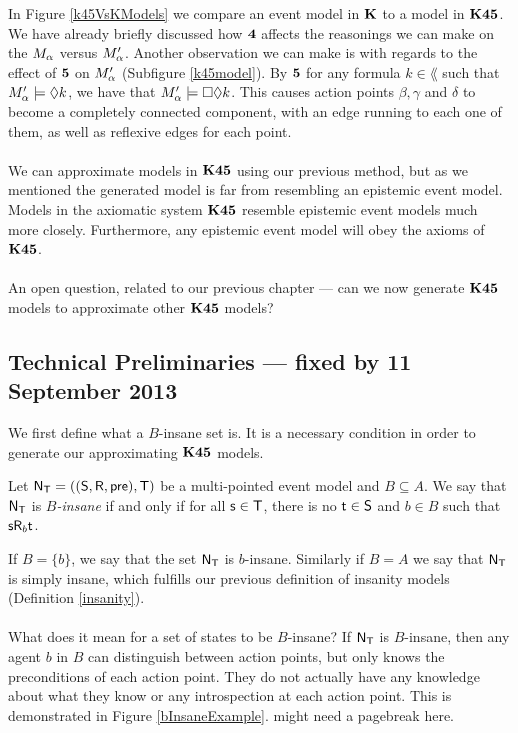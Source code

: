 In Figure \ref{k45VsKModels} we compare an event model in $\bf K$ to a model in $\bf K45$.
We have already briefly discussed how $\bf 4$ affects the reasonings we can make on the $M_\alpha$ versus
$M'_\alpha$.
Another observation we can make is with regards to the effect of $\bf 5$ on $M'_\alpha$ (Subfigure
\ref{k45model}).
By $\bf 5$ for any formula $k \in \lang$ such that $M'_\alpha \models
\Diamond k$, we have that $M'_\alpha \models \Box \Diamond k$.
This causes action points $\beta, \gamma$ and $\delta$ to become a completely connected component,
with an edge running to each one of them, as well as reflexive edges for each point.\\
\\
We can approximate models in $\bf K45$ using our previous method, but as we mentioned
the generated model is far from resembling an epistemic event model.
Models in the axiomatic system $\bf K45$ resemble epistemic event models much more closely.
Furthermore, any epistemic event model will obey the axioms of $\bf K45$.\\
\\
An open question, related to our previous chapter --- can we now generate $\bf K45$ models to
approximate other $\bf K45$ models?

\subsection{Technical Preliminaries --- fixed by 11 September 2013}

We first define what a $B$-insane set is.
It is a necessary condition in order to generate our approximating $\bf K45$ models.

\begin{defn} \label{binsane}
	Let $\mathrm{\mathsf{N}}_\mathrm{\mathsf{T}} = ((\mathrm{\mathsf{S}}, \mathrm{\mathsf{R}}, \mathrm{\mathsf{pre}}), \mathrm{\mathsf{T}})$ be a multi-pointed event model and $B \subseteq A$.
	We say that $\mathrm{\mathsf{N}}_\mathrm{\mathsf{T}}$ is {\em $B$-insane} if and only if for all $\mathrm{\mathsf{s}} \in \mathrm{\mathsf{T}}$,
  there is no $\mathrm{\mathsf{t}} \in \mathrm{\mathsf{S}}$ and $b \in B$ such that $\mathrm{\mathsf{s}} \mathrm{\mathsf{R}}_b \mathrm{\mathsf{t}}$.
\end{defn}

If $B = \{b\}$, we say that the set $\mathrm{\mathsf{N}}_\mathrm{\mathsf{T}}$ is $b$-insane.
Similarly if $B = A$ we say that $\mathrm{\mathsf{N}}_\mathrm{\mathsf{T}}$ is simply insane, which fulfills
our previous definition of insanity models (Definition \ref{insanity}).\\
\\
What does it mean for a set of states to be $B$-insane?
If $\mathrm{\mathsf{N}}_\mathrm{\mathsf{T}}$ is $B$-insane, then any agent $b$ in $B$ can distinguish between
action points, but only knows the preconditions of each action point.
They do not actually have any knowledge about what they know or any
introspection at each action point.
This is demonstrated in Figure \ref{bInsaneExample}.
\FIXME might need a pagebreak here.

